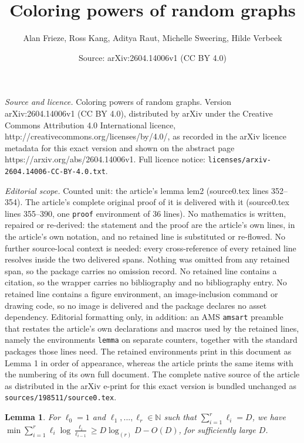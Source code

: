 \documentclass[10pt,a4paper]{amsart}
\title{Coloring powers of random graphs}
\author{Alan Frieze, Ross Kang, Aditya Raut, Michelle Sweering, Hilde Verbeek}
\date{Source: arXiv:2604.14006v1 (CC BY 4.0)}
\newtheorem{lemma}{Lemma}
\def\N{\mathbb{N}}
\begin{document}
\maketitle

\noindent\emph{Source and licence.} Coloring powers of random graphs. Version arXiv:2604.14006v1 (CC BY 4.0), distributed by arXiv under the Creative Commons Attribution 4.0 International licence, http://creativecommons.org/licenses/by/4.0/, as recorded in the arXiv licence metadata for this exact version and shown on the abstract page https://arxiv.org/abs/2604.14006v1. Full licence notice: \texttt{licenses/arxiv-2604.14006-CC-BY-4.0.txt}.\par\smallskip

\noindent\textit{Editorial scope.} Counted unit: the article's lemma lem2 (source0.tex lines 352--354). The article's complete original proof of it is delivered with it (source0.tex lines 355--390, one \texttt{proof} environment of 36 lines). No mathematics is written, repaired or re-derived: the statement and the proof are the article's own lines, in the article's own notation, and no retained line is substituted or re-flowed.  No further source-local context is needed: every cross-reference of every retained line resolves inside the two delivered spans.  Nothing was omitted from any retained span, so the package carries no omission record.  No retained line contains a citation, so the wrapper carries no bibliography and no bibliography entry.  No retained line contains a figure environment, an image-inclusion command or drawing code, so no image is delivered and the package declares no asset dependency.  Editorial formatting only, in addition: an AMS \texttt{amsart} preamble that restates the article's own declarations and macros used by the retained lines, namely the environments \texttt{lemma} on separate counters, together with the standard packages those lines need.  The retained environments print in this document as Lemma 1 in order of appearance, whereas the article prints the same items with the numbering of its own full document.  The complete native source of the article as distributed in the arXiv e-print for this exact version is bundled unchanged as \texttt{sources/198511/source0.tex}.
\begin{lemma}\label{lem2}
	For $\ell_0=1$ and $\ell_1,...,\ell_r \in \N$ such that $\sum\limits_{i=1}^r \ell_i = D$, we have $\min \sum\limits_{i=1}^r \ell_i \log \frac{\ell_i}{\ell_{i-1}} \geq D\log_{(r)}D - O(D)$, for sufficiently large $D$.
\end{lemma}
\end{document}
